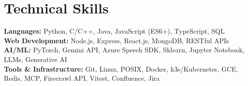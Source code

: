 \section{Technical Skills}
 \begin{itemize}[leftmargin=0.15in, label={}]
    \small{
        \item{
            \textbf{Languages: }{Python, C/C++, Java, JavaScript (ES6+), TypeScript, SQL} \\
            \textbf{Web Development: }{Node.js, Express, React.js, MongoDB, RESTful APIs} \\
            \textbf{AI/ML: }{PyTorch, Gemini API, Azure Speech SDK, Sklearn, Jupyter Notebook, LLMs, Generative AI} \\
            \textbf{Tools \& Infrastructure: }{Git, Linux, POSIX, Docker, k3s/Kubernetes, GCE, Redis, MCP, Firecrawl API, Vitest, Confluence, Jira}
        }
    }
 \end{itemize}

